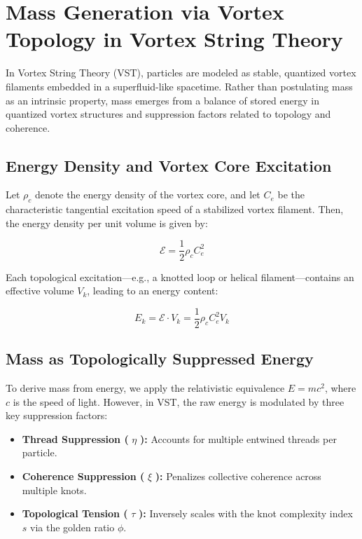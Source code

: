 \documentclass[11pt]{article}
\begin{document}
    \section{Mass Generation via Vortex Topology in Vortex String Theory}

    In Vortex String Theory (VST), particles are modeled as stable, quantized vortex filaments embedded in a superfluid-like spacetime. Rather than postulating mass as an intrinsic property, mass emerges from a balance of stored energy in quantized vortex structures and suppression factors related to topology and coherence.

    \subsection{Energy Density and Vortex Core Excitation}

    Let \( \rho_c \) denote the energy density of the vortex core, and let \( C_e \) be the characteristic tangential excitation speed of a stabilized vortex filament. Then, the energy density per unit volume is given by:

    \[
        \mathcal{E} = \frac{1}{2} \rho_c C_e^2
    \]

    Each topological excitation—e.g., a knotted loop or helical filament—contains an effective volume \( V_k \), leading to an energy content:

    \[
        E_k = \mathcal{E} \cdot V_k = \frac{1}{2} \rho_c C_e^2 V_k
    \]

    \subsection{Mass as Topologically Suppressed Energy}

    To derive mass from energy, we apply the relativistic equivalence \( E = mc^2 \), where \( c \) is the speed of light. However, in VST, the raw energy is modulated by three key suppression factors:

    \begin{itemize}
        \item \textbf{Thread Suppression (} \( \eta \) \textbf{):} Accounts for multiple entwined threads per particle.
        \item \textbf{Coherence Suppression (} \( \xi \) \textbf{):} Penalizes collective coherence across multiple knots.
        \item \textbf{Topological Tension (} \( \tau \) \textbf{):} Inversely scales with the knot complexity index \( s \) via the golden ratio \( \phi \).
    \end{itemize}
\end{document}
